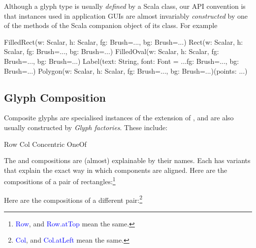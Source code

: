 \documentclass[12pt,a4paper]{article}
\def\Scala#1{\textcolor{blue}{\textsf{#1}}}
\def\SS#1{\subsection{#1}}
\begin{document}
Although a glyph type is usually \textit{defined} by a Scala class,
our API convention is that instances used in application GUIs are
almost invariably \textit{constructed} by one of the methods of the
Scala companion object of its class. For example

\begin{scala}
 FilledRect(w: Scalar, h: Scalar,    fg: Brush=..., bg: Brush=...)
 Rect(w: Scalar, h: Scalar,          fg: Brush=..., bg: Brush=...)
 FilledOval(w: Scalar, h: Scalar,    fg: Brush=..., bg: Brush=...)
 Label(text: String, font: Font = ...fg: Brush=..., bg: Brush=...)
 Polygon(w: Scalar, h: Scalar,
         fg: Brush=..., bg: Brush=...)(points: ...)
\end{scala}




\clearpage



\SS{Glyph Composition}

Composite glyphs are specialised instances of the 
extension of , and are also usually constructed by
\textit{Glyph factories}. These include:

\begin{scala}

        Row             Col
        Concentric      OneOf
\end{scala}

The  and  compositions are (almost)
explainable by their names. Each has variants that
explain the exact way in which components are aligned. Here
are the   
compositions of a pair of rectangles:\footnote{\Scala{Row}, and \Scala{Row.atTop}
mean the same.}
\begin{center}

\quad\quad
{}
\quad\quad
{}
\end{center}

Here
are the   
compositions of a different pair:\footnote{\Scala{Col}, and
\Scala{Col.atLeft} mean the same.}
\begin{center}

\quad\quad
{}
\quad\quad
{}
\end{center}
\end{document}
